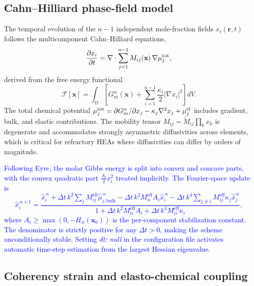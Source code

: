 \documentclass[12pt]{article}
\begin{document}
\subsection{Cahn--Hilliard phase-field model}

The temporal evolution of the $n-1$ independent mole-fraction fields $x_i(\mathbf{r},t)$ follows the multicomponent Cahn--Hilliard equations,\cite{cahn1958free}
\begin{equation}
  \frac{\partial x_i}{\partial t} = \nabla \cdot \sum_{j=1}^{n-1} M_{ij}(\mathbf{x})\,\nabla \mu_j^{\rm tot},
\end{equation}
derived from the free energy functional
\begin{equation}
  \mathcal{F}[\mathbf{x}] = \int_\Omega \!\left[ G_m^\alpha(\mathbf{x}) + \sum_{i=1}^{n-1} \frac{\kappa_i}{2}|\nabla x_i|^2 \right] dV.
\end{equation}
The total chemical potential $\mu_j^{\rm tot} = \partial G_m^\alpha/\partial x_j - \kappa_j\nabla^2 x_j + \mu_j^{\rm el}$ includes gradient, bulk, and elastic contributions. The mobility tensor $M_{ij} = \mathring{M}_{ij}\prod_k x_k$ is degenerate and accommodates strongly asymmetric diffusivities across elements, which is critical for refractory HEAs where diffusivities can differ by orders of magnitude.

\textcolor{blue}{Following Eyre,\cite{eyre1998unconditionally} the molar Gibbs energy is split into convex and concave parts, with the convex quadratic part $\frac{A_i}{2}x_i^2$ treated implicitly. The Fourier-space update is
\begin{equation}
  \hat{x}_i^{\,n+1} = \frac{
    \hat{x}_i^{\,n}
    + \Delta t\,k^2 \sum_j M^{\mathrm{eff}}_{ij}\hat{\mu}_{j,\mathrm{bulk}}^{\,n}
    - \Delta t\,k^2 M^{\mathrm{eff}}_{ii} A_i \hat{x}_i^{\,n}
    - \Delta t\,k^4 \sum_{j \neq i} M^{\mathrm{eff}}_{ij}\kappa_j \hat{x}_j^{\,n}
  }{
    1 + \Delta t\,k^2 M^{\mathrm{eff}}_{ii} A_i + \Delta t\,k^4 M^{\mathrm{eff}}_{ii}\kappa_i
  },
  \label{eq:eyre_update}
\end{equation}
where $A_i \geq \max(0, -H_{ii}(\mathbf{x}_0))$ is the per-component stabilization constant. The denominator is strictly positive for any $\Delta t > 0$, making the scheme unconditionally stable. Setting \emph{dt: null} in the configuration file activates automatic time-step estimation from the largest Hessian eigenvalue.}

\subsection{Coherency strain and elasto-chemical coupling}
\end{document}
